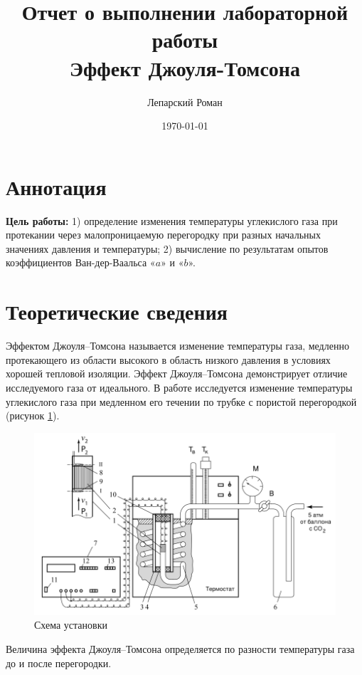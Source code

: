 \documentclass[12pt]{article}
\title{Отчет о выполнении лабораторной работы \\ Эффект Джоуля-Томсона}
\author{Лепарский Роман}
\date{\today}
\begin{document}
\maketitle

\newpage

\section{Аннотация}

\textbf{Цель работы:} 1) определение изменения температуры углекислого газа при протекании через малопроницаемую перегородку при
разных начальных значениях давления
и температуры; 2) вычисление по результатам опытов
коэффициентов Ван-дер-Ваальса «$a$» и
«$b$».

\section{Теоретические сведения}

Эффектом Джоуля–Томсона называется изменение температуры
газа, медленно протекающего из области высокого в область низкого давления в условиях хорошей тепловой изоляции. Эффект Джоуля–Томсона демонстрирует отличие исследуемого газа от идеального. В работе исследуется изменение температуры углекислого газа при медленном его течении по трубке с пористой перегородкой (рисунок \ref{fig:stand}). 

\begin{figure}[!htb]
	\centering
	\includegraphics[scale = 0.5]{./stand.png}
	\caption{Схема установки}
	\label{fig:stand}
\end{figure}

Величина эффекта Джоуля–Томсона определяется по разности температуры газа до и после перегородки.
\end{document}
